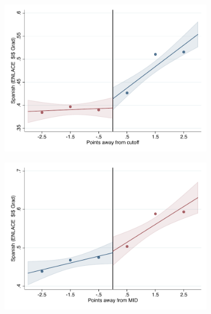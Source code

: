 \documentclass[oneside,11pt]{article}
\begin{document}
\begin{figure}[H]

    \ContinuedFloat
    \caption{(Cont.) RD plots for outcome variables across those assigned to IPN high-school, and those who are not\label{fig:ITT_rd_plot_IPN_2}}
    \begin{center}
    
    \begin{subfigure}{0.475\textwidth}
        \centering
        \includegraphics[width=\textwidth]{04_Figures/rd_plot_tau_p_esp_3_IPN3.pdf}
    \end{subfigure}
    \begin{subfigure}{0.475\textwidth}
        \centering
        \includegraphics[width=\textwidth]{04_Figures/rd_plot_mid_p_esp_3_IPN3.pdf}
    \end{subfigure}


\end{center}
\end{figure}
\end{document}
